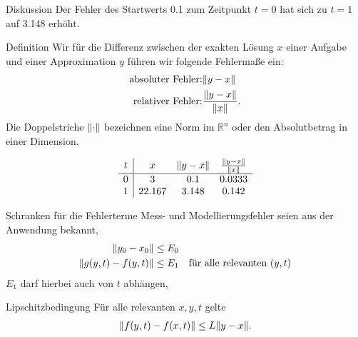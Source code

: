 \begin{frame}{Diskussion}
  Der Fehler des Startwerts 0.1 zum Zeitpunkt $t=0$ hat sich zu $t=1$ auf
  3.148 erhöht.

  \vspace{1cm}
  
\end{frame}

\begin{frame}
\begin{block}{Definition}
    Wir für die Differenz zwischen der exakten Lösung $x$ einer
    Aufgabe und einer Approximation $y$ führen wir folgende Fehlermaße
    ein:
    \begin{align*}
      \text{absoluter Fehler:}& \lVert y-x\rVert\\
      \text{relativer Fehler:}& \frac{\lVert y-x\rVert}{\lVert x\rVert}.      
    \end{align*}
    Die Doppelstriche $\lVert\cdot\rVert$ bezeichnen eine Norm im
    $\mathbb R^n$ oder den Absolutbetrag in einer Dimension.
  \end{block}
  \begin{gather*}
    \begin{array}{c|ccc}
      t & x & \lVert y-x\rVert & \frac{\lVert y-x\rVert}{\lVert x\rVert}
      \\\hline
      0 & 3 & 0.1 & 0.0333\\
      1 & 22.167 & 3.148 & 0.142
    \end{array}
  \end{gather*}
\end{frame}

\begin{frame}{Schranken für die Fehlerterme}
  Mess- und Modellierungsfehler seien aus der Anwendung bekannt,
  \begin{align*}
    \lVert y_0-x_0\rVert &\le E_0\\
    \lVert g(y,t)-f(y,t)\rVert &\le E_1 \quad\text{für alle relevanten $(y,t)$}
  \end{align*}
  $E_1$ darf hierbei auch von $t$ abhängen,
  \pause
  \begin{block}{Lipschitzbedingung}
    Für alle relevanten $x,y,t$ gelte
    \begin{gather*}
      \lVert f(y,t) - f(x,t)\rVert \le L \lVert y-x\rVert.
    \end{gather*}
  \end{block}
\end{frame}

